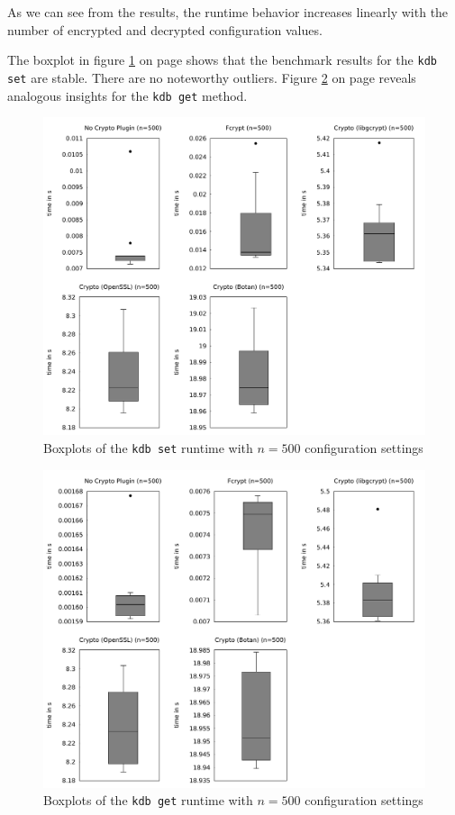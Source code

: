 As we can see from the results, the runtime behavior increases linearly with the number of encrypted and decrypted configuration values.

The boxplot in figure \ref{eval-boxplot-set} on page \pageref{eval-boxplot-set} shows that the benchmark results for the \texttt{kdb set} are stable.
There are no noteworthy outliers.
Figure \ref{eval-boxplot-get} on page \pageref{eval-boxplot-get} reveals analogous insights for the \texttt{kdb get} method.

\begin{figure}[h]
\center
\caption{Boxplots of the \texttt{kdb set} runtime with $n = 500$ configuration settings}
\label{eval-boxplot-set}
\includegraphics[width=\columnwidth]{plots/boxplot_500_set.pdf}
\end{figure}

\begin{figure}[h]
\center
\caption{Boxplots of the \texttt{kdb get} runtime with $n = 500$ configuration settings}
\label{eval-boxplot-get}
\includegraphics[width=\columnwidth]{plots/boxplot_500_get.pdf}
\end{figure}

